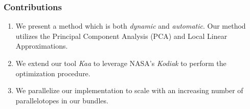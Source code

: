 \documentclass{beamer}
\begin{document}
\begin{frame}
  \frametitle{Contributions}
  \begin{enumerate}
    \item We present a method which is both \emph{dynamic} and \emph{automatic}. Our method utilizes the Principal Component Analysis (PCA) and Local Linear Approximations.
    \item  We extend our tool \emph{Kaa} to leverage NASA's \emph{Kodiak} to perform the optimization procedure.
    \item We parallelize our implementation to scale with an increasing number of parallelotopes in our bundles.
  \end{enumerate}
\end{frame}
\end{document}
